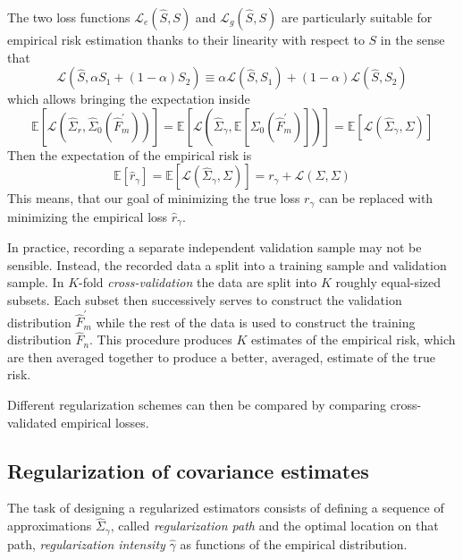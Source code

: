  The two loss functions $\mathcal L_e(\hat S,S)$ and $\mathcal L_g(\hat S,S)$ are particularly suitable for empirical risk estimation thanks to their linearity with respect to $S$ in the sense that 
\begin{equation}
\mathcal L\left(\hat S,\alpha S_1 + (1-\alpha)S_2\right) 
\equiv 
\alpha\mathcal L(\hat S,S_1) + (1-\alpha)\mathcal L(\hat S,S_2)
\end{equation}
which allows bringing the expectation inside 
\begin{equation}
\mathbb E\left[ \mathcal L\left(\hat\Sigma_r, \hat\Sigma_0(\hat F_m^\prime)\right) \right] 
=
\mathbb E\left[ \mathcal L\left(\hat\Sigma_\gamma, \mathbb E\left[\Sigma_0(\hat F_m^\prime)\right]\right) \right] 
=
\mathbb E\left[ \mathcal L\left(\hat\Sigma_\gamma, \Sigma\right) \right] 
\end{equation}
Then the expectation of the empirical risk is 
\begin{equation}
\mathbb E\left[\hat r_\gamma\right] 
= \mathbb E\left[\mathcal L(\hat\Sigma_\gamma,\Sigma)\right]
= r_\gamma + \mathcal L(\Sigma,\Sigma)
\end{equation}
This means, that our goal of minimizing the true loss $r_\gamma$ can be replaced with minimizing  the empirical loss $\hat r_\gamma$.

In practice, recording a separate independent validation sample may not be sensible.  Instead, the recorded data a split into a training sample and validation sample. In $K$-fold \emph{cross-validation} the data are split into $K$ roughly equal-sized subsets. Each subset then successively serves to construct the validation distribution $\hat F_m^\prime$  while the rest of the data is used to construct the training distribution $\hat F_n$.  This procedure produces $K$ estimates of the empirical risk, which are then averaged together to produce a better, averaged, estimate of the true risk.

Different regularization schemes can then be compared by comparing cross-validated empirical losses.

 
\subsection{Regularization of covariance estimates}
The task of designing a regularized estimators consists of defining a sequence of approximations $\hat\Sigma_\gamma$, called \emph{regularization path} and the optimal location on that path, \emph{regularization intensity} $\hat\gamma$ as  functions of the empirical distribution. 

